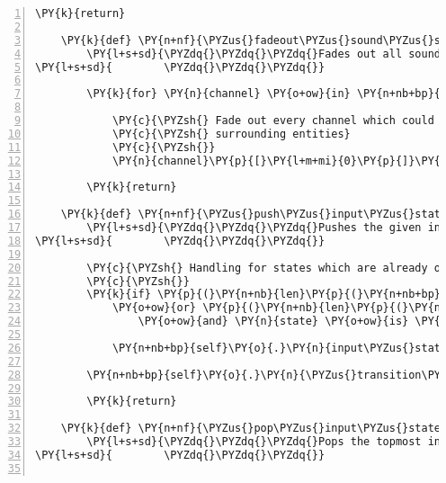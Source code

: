 \begin{Verbatim}[commandchars=\\\{\},numbers=left,firstnumber=1,stepnumber=1]
        \PY{k}{return}

    \PY{k}{def} \PY{n+nf}{\PYZus{}fadeout\PYZus{}sound\PYZus{}surrounding\PYZus{}entities}\PY{p}{(}\PY{n+nb+bp}{self}\PY{p}{)}\PY{p}{:}
        \PY{l+s+sd}{\PYZdq{}\PYZdq{}\PYZdq{}Fades out all sounds that are playing from surrounding Entities.}
\PY{l+s+sd}{        \PYZdq{}\PYZdq{}\PYZdq{}}

        \PY{k}{for} \PY{n}{channel} \PY{o+ow}{in} \PY{n+nb+bp}{self}\PY{o}{.}\PY{n}{surrounding\PYZus{}position\PYZus{}channels}\PY{p}{:}

            \PY{c}{\PYZsh{} Fade out every channel which could play back sounds of}
            \PY{c}{\PYZsh{} surrounding entities}
            \PY{c}{\PYZsh{}}
            \PY{n}{channel}\PY{p}{[}\PY{l+m+mi}{0}\PY{p}{]}\PY{o}{.}\PY{n}{fadeout}\PY{p}{(}\PY{l+m+mi}{300}\PY{p}{)}

        \PY{k}{return}

    \PY{k}{def} \PY{n+nf}{\PYZus{}push\PYZus{}input\PYZus{}state\PYZus{}on\PYZus{}stack}\PY{p}{(}\PY{n+nb+bp}{self}\PY{p}{,} \PY{n}{state}\PY{p}{)}\PY{p}{:}
        \PY{l+s+sd}{\PYZdq{}\PYZdq{}\PYZdq{}Pushes the given input state on the stack and performs a state transition to it.}
\PY{l+s+sd}{        \PYZdq{}\PYZdq{}\PYZdq{}}

        \PY{c}{\PYZsh{} Handling for states which are already on the stack}
        \PY{c}{\PYZsh{}}
        \PY{k}{if} \PY{p}{(}\PY{n+nb}{len}\PY{p}{(}\PY{n+nb+bp}{self}\PY{o}{.}\PY{n}{input\PYZus{}state\PYZus{}stack}\PY{p}{)} \PY{o+ow}{is} \PY{l+m+mi}{0}
            \PY{o+ow}{or} \PY{p}{(}\PY{n+nb}{len}\PY{p}{(}\PY{n+nb+bp}{self}\PY{o}{.}\PY{n}{input\PYZus{}state\PYZus{}stack}\PY{p}{)} \PY{o}{\PYZgt{}} \PY{l+m+mi}{0}
                \PY{o+ow}{and} \PY{n}{state} \PY{o+ow}{is} \PY{o+ow}{not} \PY{n+nb+bp}{self}\PY{o}{.}\PY{n}{input\PYZus{}state\PYZus{}stack}\PY{p}{[}\PY{o}{\PYZhy{}}\PY{l+m+mi}{1}\PY{p}{]}\PY{p}{)}\PY{p}{)}\PY{p}{:}

            \PY{n+nb+bp}{self}\PY{o}{.}\PY{n}{input\PYZus{}state\PYZus{}stack}\PY{o}{.}\PY{n}{append}\PY{p}{(}\PY{n}{state}\PY{p}{)}

        \PY{n+nb+bp}{self}\PY{o}{.}\PY{n}{\PYZus{}transition\PYZus{}to\PYZus{}input\PYZus{}state}\PY{p}{(}\PY{p}{)}

        \PY{k}{return}

    \PY{k}{def} \PY{n+nf}{\PYZus{}pop\PYZus{}input\PYZus{}state\PYZus{}from\PYZus{}stack}\PY{p}{(}\PY{n+nb+bp}{self}\PY{p}{)}\PY{p}{:}
        \PY{l+s+sd}{\PYZdq{}\PYZdq{}\PYZdq{}Pops the topmost input state from the stack and performs a transition to the previous state.}
\PY{l+s+sd}{        \PYZdq{}\PYZdq{}\PYZdq{}}


\end{Verbatim}
